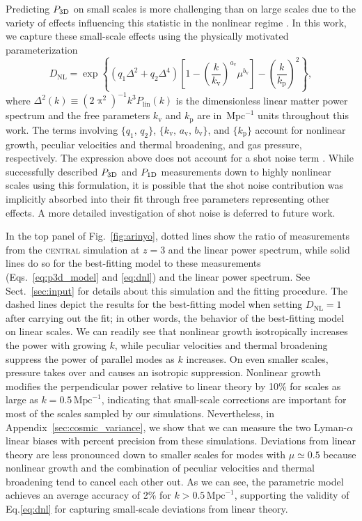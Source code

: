 \documentclass[longauth]{aa}
\newcommand{\lya}{Lyman-$\alpha$\xspace}
\newcommand{\poned}{\ensuremath{P_{\rm 1D}}\xspace}
\newcommand{\pthreed}{\ensuremath{P_{\rm 3D}}\xspace}
\newcommand{\simcentral}{\textsc{central}\xspace}
\newcommand{\iMpc}{\ensuremath{\,\mathrm{Mpc}^{-1}}}
\begin{document}
Predicting \pthreed on small scales is more challenging than on large scales due to the variety of effects influencing this statistic in the nonlinear regime \citep[e.g.,][]{mcdonald2003MeasurementCosmologicalGeometry}. In this work, we capture these small-scale effects using the physically motivated \citet{arinyo-i-prats2015NonlinearPowerSpectrum} parameterization
%
\begin{equation}
    \label{eq:dnl}
    D_\mathrm{NL} = \exp \left\{\left(q_1 \Delta^2 + q_2 \Delta^4\right) \left[1-\left(\frac{k}{k_\mathrm{v}}\right)^{a_\mathrm{v}} \mu^{b_\mathrm{v}}\right] - \left(\frac{k}{k_\mathrm{p}}\right)^2 \right\},
\end{equation}
%
where $\Delta^2(k)\equiv(2\uppi^2)^{-1} k^3 P_\mathrm{lin}(k)$ is the dimensionless linear matter power spectrum and the free parameters $k_\mathrm{v}$ and $k_\mathrm{p}$ are in $\iMpc$ units throughout this work. The terms involving $\{q_1,\,q_2\}$, $\{k_\mathrm{v},\, a_\mathrm{v},\, b_\mathrm{v}\}$, and $\{k_\mathrm{p}\}$ account for nonlinear growth, peculiar velocities and thermal broadening, and gas pressure, respectively. The expression above does not account for a shot noise term \citep[e.g.,][]{irsicmcquinn2018}. While \citet{givans2022NonlinearitiesLymanAlpha} successfully described \pthreed and \poned measurements down to highly nonlinear scales using this formulation, it is possible that the shot noise contribution was implicitly absorbed into their fit through free parameters representing other effects. A more detailed investigation of shot noise is deferred to future work.

In the top panel of Fig.~\ref{fig:arinyo}, dotted lines show the ratio of measurements from the \simcentral simulation at $z=3$ and the linear power spectrum, while solid lines do so for the best-fitting model to these measurements (Eqs.~\ref{eq:p3d_model} and \ref{eq:dnl}) and the linear power spectrum. See Sect.~\ref{sec:input} for details about this simulation and the fitting procedure. The dashed lines depict the results for the best-fitting model when setting $D_\mathrm{NL}=1$ after carrying out the fit; in other words, the behavior of the best-fitting model on linear scales. We can readily see that nonlinear growth isotropically increases the power with growing $k$, while peculiar velocities and thermal broadening suppress the power of parallel modes as $k$ increases. On even smaller scales, pressure takes over and causes an isotropic suppression. Nonlinear growth modifies the perpendicular power relative to linear theory by 10\% for scales as large as $k=0.5\iMpc$, indicating that small-scale corrections are important for most of the scales sampled by our simulations. Nevertheless, in Appendix~\ref{sec:cosmic_variance}, we show that we can measure the two \lya linear biases with percent precision from these simulations. Deviations from linear theory are less pronounced down to smaller scales for modes with $\mu\simeq0.5$ because nonlinear growth and the combination of peculiar velocities and thermal broadening tend to cancel each other out. As we can see, the parametric model achieves an average accuracy of 2\% for $k>0.5\iMpc$, supporting the validity of Eq.\ref{eq:dnl} for capturing small-scale deviations from linear theory.
\end{document}
